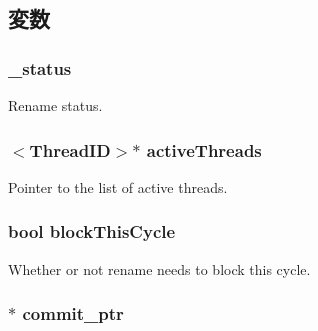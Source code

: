 \subsection{変数}
\hypertarget{classDefaultRename_a1564313ed7a74659481a1b5ea2bacf88}{
\subsubsection[{\_\-status}]{ {\bf \_\-status}}}
\label{classDefaultRename_a1564313ed7a74659481a1b5ea2bacf88}
Rename status. \hypertarget{classDefaultRename_af6eaea53db532812052f71bf0380dab5}{
\subsubsection[{activeThreads}]{$<${\bf ThreadID}$>$$\ast$ {\bf activeThreads}}}
\label{classDefaultRename_af6eaea53db532812052f71bf0380dab5}
Pointer to the list of active threads. \hypertarget{classDefaultRename_a5a5235d747599dbd49a887663f3739e8}{
\subsubsection[{blockThisCycle}]{\setlength{\rightskip}{0pt plus 5cm}bool {\bf blockThisCycle}}}
\label{classDefaultRename_a5a5235d747599dbd49a887663f3739e8}
Whether or not rename needs to block this cycle. \hypertarget{classDefaultRename_a51b23beeb9e078c0c11831d0f2e56bfd}{
\subsubsection[{commit\_\-ptr}]{$\ast$ {\bf commit\_\-ptr}}}

